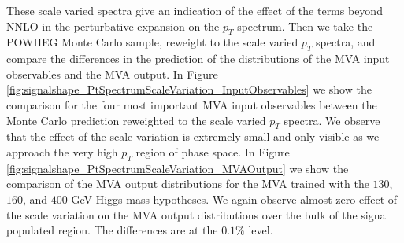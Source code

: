 These scale varied spectra give an indication of the
effect of the terms beyond NNLO in the perturbative expansion on the $p_{T}$ 
spectrum. Then we take the POWHEG Monte Carlo sample, reweight to the scale 
varied $p_{T}$ spectra, and compare the differences in the prediction of 
the distributions of the MVA input observables and the MVA output. In Figure
\ref{fig:signalshape_PtSpectrumScaleVariation_InputObservables} we show the
comparison for the four most important MVA input observables between the
Monte Carlo prediction reweighted to the scale varied $p_{T}$ spectra. We
observe that the effect of the scale variation is extremely small and only
visible as we approach the very high $p_{T}$ region of phase space. In Figure
\ref{fig:signalshape_PtSpectrumScaleVariation_MVAOutput} we show the comparison
of the MVA output distributions for the MVA trained with the $130$, $160$,
and $400$ GeV Higgs mass hypotheses. We again observe almost zero effect of 
the scale variation on the MVA output distributions over the bulk of the signal
populated region. The differences are at the $0.1\%$ level.



